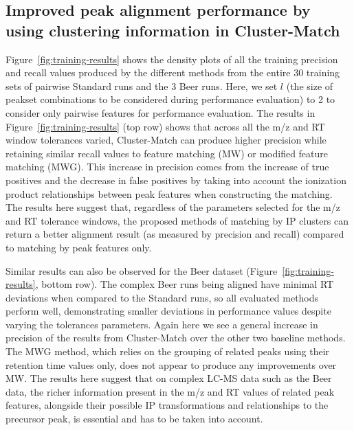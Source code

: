 \subsection{Improved peak alignment performance by using clustering information in Cluster-Match}

Figure~\ref{fig:training-results} shows the density plots of all the training precision and recall values produced by the different methods from the entire 30 training sets of pairwise Standard runs and the 3 Beer runs. Here, we set $l$ (the size of peakset combinations to be considered during performance evaluation) to 2 to consider only pairwise features for performance evaluation. The results in Figure~\ref{fig:training-results} (top row) shows that across all the m/z and RT window tolerances varied, Cluster-Match can produce higher precision while retaining similar recall values to feature matching (MW) or modified feature matching (MWG). This increase in precision comes from the increase of true positives and the decrease in false positives by taking into account the ionization product relationships between peak features when constructing the matching. The results here suggest that, regardless of the parameters selected for the m/z and RT tolerance windows, the proposed methods of matching by IP clusters can return a better alignment result (as measured by precision and recall) compared to matching by peak features only.

Similar results can also be observed for the Beer dataset (Figure~\ref{fig:training-results}, bottom row). The complex Beer runs being aligned have minimal RT deviations when compared to the Standard runs, so all evaluated methods perform well, demonstrating smaller deviations in performance values despite varying the tolerances parameters. Again here we see a general increase in precision of the results from Cluster-Match over the other two baseline methods. The MWG method, which relies on the grouping of related peaks using their retention time values only, does not appear to produce any improvements over MW. The results here suggest that on complex LC-MS data such as the Beer data, the richer information present in the m/z and RT values of related peak features, alongside their possible IP transformations and relationships to the precursor peak, is essential and has to be taken into account.

